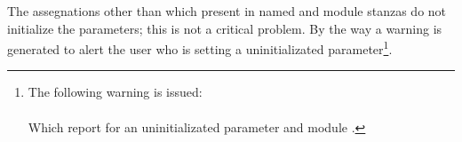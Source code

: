 The assegnations other than which present in named and module stanzas do not initialize
the parameters; this is not a critical problem. By the way a warning is generated to alert
the user who is setting a uninitializated parameter\footnote{The following warning is issued:\\
\\
Which report for an uninitializated parameter  and module .}.
